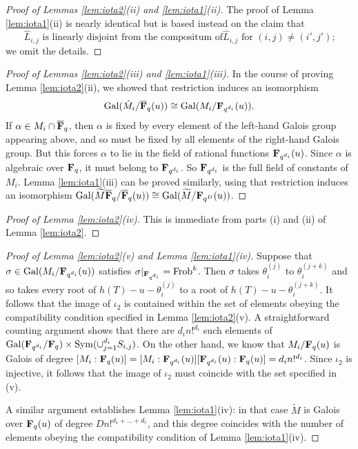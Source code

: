 \documentclass[a4paper]{compositio}
\begin{document}
\begin{proof}[Proof of Lemmas \ref{lem:iota2}(ii) and \ref{lem:iota1}(ii)]
The proof of Lemma \ref{lem:iota1}(ii) is nearly identical but is
based instead on the claim that
\begin{equation}\label{eq:disjoint2}
\hat{L}_{i,j} \text{ is linearly disjoint from the compositum of
$\hat{L}_{i,j}$ for $(i,j) \neq (i', j')$;}
\end{equation}
we omit the details.\end{proof}

\begin{proof}[Proof of Lemmas \ref{lem:iota2}(iii) and
\ref{lem:iota1}(iii)] In the course of proving Lemma
\ref{lem:iota2}(ii), we showed that restriction induces an
isomorphism
\[ \mathrm{Gal}(\hat{M}_i/\overline{\mathbf{F}}_q(u)) \cong \mathrm{Gal}(M_i/\mathbf{F}_{q^{d_i}}(u)).\]
If $\alpha \in M_i \cap \overline{\mathbf{F}}_q$, then $\alpha$ is fixed by
every element of the left-hand Galois group appearing above, and so
must be fixed by all elements of the right-hand Galois group. But
this forces $\alpha$ to lie in the field of rational functions
$\mathbf{F}_{q^{d_i}}(u)$. Since $\alpha$ is algebraic over $\mathbf{F}_q$, it must
belong to $\mathbf{F}_{q^{d_i}}$. So $\mathbf{F}_{q^{d_i}}$ is the full field of
constants of $M_i$. Lemma \ref{lem:iota1}(iii) can be proved
similarly, using that restriction induces an isomorphism
$\mathrm{Gal}(\widetilde{M} \overline{\mathbf{F}}_q/\overline{\mathbf{F}}_q(u)) \cong
\mathrm{Gal}(\widetilde{M}/\mathbf{F}_{q^{D}}(u))$.\end{proof}

\begin{proof}[Proof of Lemma \ref{lem:iota2}(iv)] This is immediate from parts (i) and (ii) of Lemma \ref{lem:iota2}.
\end{proof}

\begin{proof}[Proof of Lemma \ref{lem:iota2}(v) and Lemma
\ref{lem:iota1}(iv)] Suppose that $\sigma \in
\mathrm{Gal}(M_i/\mathbf{F}_{q^{d_i}}(u))$ satisfies $\sigma|_{\mathbf{F}_{q^{d_i}}} =
\mathrm{Frob}^k$. Then $\sigma$ takes $\theta_i^{(j)}$ to $\theta_i^{(j+k)}$
and so takes every root of $h(T)-u-\theta_i^{(j)}$ to a root of
$h(T) - u - \theta_i^{(j+k)}$. It follows that the image of
$\iota_2$ is contained within the set of elements obeying the
compatibility condition specified in Lemma \ref{lem:iota2}(v). A
straightforward counting argument shows that there are $d_i
n!^{d_i}$ such elements of $\mathrm{Gal}(\mathbf{F}_{q^{d_i}}/\mathbf{F}_{q}) \times
\mathrm{Sym}(\cup_{j=1}^{d_i}S_{i,j})$. On the other hand, we know that
$M_i/\mathbf{F}_q(u)$ is Galois of degree $[M_i: \mathbf{F}_q(u)] =[M_i:
\mathbf{F}_{q^{d_i}}(u)][\mathbf{F}_{q^{d_i}}(u):\mathbf{F}_q(u)] = d_i n!^{d_i}$. Since
$\iota_2$ is injective, it follows that the image of $\iota_2$ must
coincide with the set specified in (v).

A similar argument establishes Lemma \ref{lem:iota1}(iv): in that
case $\widetilde{M}$ is Galois over $\mathbf{F}_q(u)$ of degree $D n!^{d_1+
\dots + d_r}$, and this degree coincides with the number of elements
obeying the compatibility condition of Lemma \ref{lem:iota1}(iv).
\end{proof}
\end{document}
